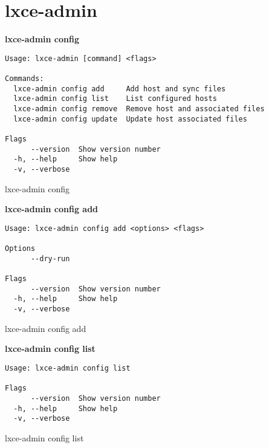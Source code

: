 \newpage\section{lxce-admin}

\textbf{lxce-admin config}
\begin{listing}[H]
\begin{verbatim}
Usage: lxce-admin [command] <flags>

Commands:
  lxce-admin config add     Add host and sync files
  lxce-admin config list    List configured hosts
  lxce-admin config remove  Remove host and associated files
  lxce-admin config update  Update host associated files

Flags
      --version  Show version number                                   
  -h, --help     Show help                                             
  -v, --verbose
\end{verbatim}
\caption{lxce-admin config}
\label{listings: lxce-admin config}
\end{listing}

\textbf{lxce-admin config add}
\begin{listing}[H]
\begin{verbatim}
Usage: lxce-admin config add <options> <flags>

Options
      --dry-run                                                        

Flags
      --version  Show version number                                   
  -h, --help     Show help                                             
  -v, --verbose
\end{verbatim}
\caption{lxce-admin config add}
\label{listings: lxce-admin config add}
\end{listing}

\textbf{lxce-admin config list}
\begin{listing}[H]
\begin{verbatim}
Usage: lxce-admin config list

Flags
      --version  Show version number                                   
  -h, --help     Show help                                             
  -v, --verbose
\end{verbatim}
\caption{lxce-admin config list}
\label{listings: lxce-admin config list}
\end{listing}

